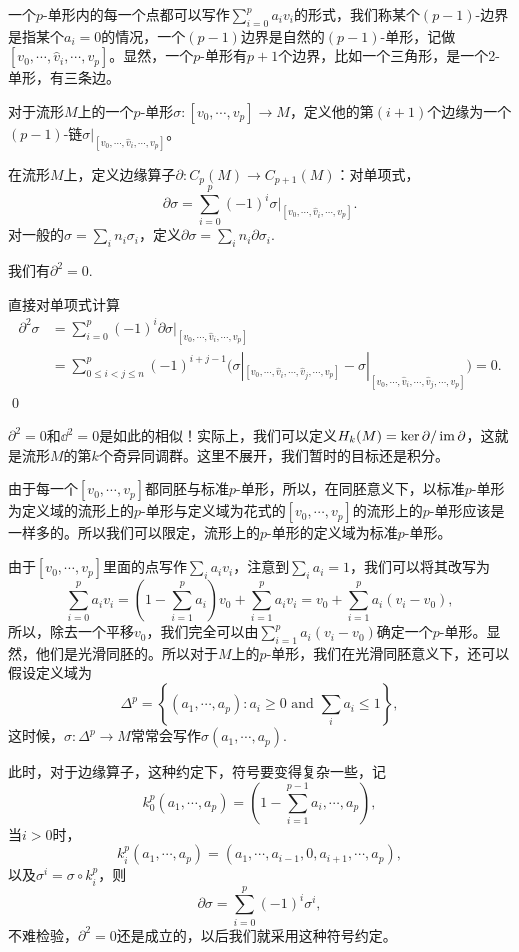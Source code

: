 \para 一个$p$-单形内的每一个点都可以写作$\sum_{i=0}^p a_iv_i$的形式，我们称某个$(p-1)$-边界是指某个$a_i=0$的情况，一个$(p-1)$边界是自然的$(p-1)$-单形，记做$[v_0,\cdots,\hat{v}_i,\cdots,v_p]$。显然，一个$p$-单形有$p+1$个边界，比如一个三角形，是一个2-单形，有三条边。

对于流形$M$上的一个$p$-单形$\sigma:[v_0,\cdots,v_p]\to M$，定义他的第$(i+1)$个边缘为一个$(p-1)$-链$\sigma|_{[v_0,\cdots,\hat{v}_i,\cdots,v_p]}$。

\para 在流形$M$上，定义边缘算子$\partial:C_p(M)\to C_{p+1}(M)$：对单项式，
\[
	\partial \sigma=\sum_{i=0}^p (-1)^i\sigma|_{[v_0,\cdots,\hat{v}_i,\cdots,v_p]}.
\]
对一般的$\sigma=\sum_i n_i \sigma_i$，定义$\partial \sigma =\sum_i n_i \partial \sigma_i$.

\para 我们有$\partial^2=0$.

\proof 直接对单项式计算
\[
\begin{aligned}
	\partial^2 \sigma&=\sum_{i=0}^p (-1)^i\partial\sigma|_{[v_0,\cdots,\hat{v}_i,\cdots,v_p]}\\
	&=\sum_{0\leq i<j\leq n}^p (-1)^{i+j-1}\bigl(\sigma|_{[v_0,\cdots,\hat{v}_i,\cdots,\hat{v}_j,\cdots,v_p]}-\sigma|_{[v_0,\cdots,\hat{v}_i,\cdots,\hat{v}_j,\cdots,v_p]}\bigr)=0.
\end{aligned}
\]\qed

$\partial^2=0$和$\dd^2=0$是如此的相似！实际上，我们可以定义$H_k(M)=\ker\partial/\operatorname{im}\partial$，这就是流形$M$的第$k$个奇异同调群。这里不展开，我们暂时的目标还是积分。

\para 由于每一个$[v_0,\cdots,v_p]$都同胚与标准$p$-单形，所以，在同胚意义下，以标准$p$-单形为定义域的流形上的$p$-单形与定义域为花式的$[v_0,\cdots,v_p]$的流形上的$p$-单形应该是一样多的。所以我们可以限定，流形上的$p$-单形的定义域为标准$p$-单形。

\para 由于$[v_0,\cdots,v_p]$里面的点写作$\sum_i a_i v_i$，注意到$\sum_i a_i=1$，我们可以将其改写为
\[
	\sum_{i=0}^pa_iv_i=\left(1-\sum_{i=1}^pa_i\right)v_0+\sum_{i=1}^pa_iv_i=v_0+\sum_{i=1}^pa_i(v_i-v_0),
\]
所以，除去一个平移$v_0$，我们完全可以由$\sum_{i=1}^pa_i(v_i-v_0)$确定一个$p$-单形。显然，他们是光滑同胚的。所以对于$M$上的$p$-单形，我们在光滑同胚意义下，还可以假设定义域为
\[
	\Delta^p=\left\{(a_1,\cdots,a_p):a_i\geq 0\text{ and }\sum_i a_i\leq 1\right\},
\]
这时候，$\sigma:\Delta^p\to M$常常会写作$\sigma(a_1,\cdots,a_p)$.

此时，对于边缘算子，这种约定下，符号要变得复杂一些，记
\[
	k^p_0(a_1,\cdots,a_{p})=\left(1-\sum_{i=1}^{p-1}a_i,\cdots,a_{p}\right),
\]
当$i>0$时，
\[
	k^p_i(a_1,\cdots,a_{p})=(a_1,\cdots,a_{i-1},0,a_{i+1},\cdots,a_{p}),
\]
以及$\sigma^i=\sigma\circ k^p_i$，则
\[
	\partial\sigma=\sum_{i=0}^p(-1)^i \sigma^i,
\]
不难检验，$\partial^2=0$还是成立的，以后我们就采用这种符号约定。

